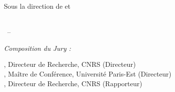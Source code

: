 \begin{titlepage}
\begin{addmargin}[-1cm]{-3cm}
\begin{center}
Sous la direction de \myProf et \myOtherProf \\ \medskip
\myDepartment \\  \medskip

\bigskip

\myTime\ -- \myVersion %

\bigskip

\textit{Composition du Jury :}

\medskip

, Directeur de Recherche, CNRS (Directeur)\\
, Maître de Conférence, Université Paris-Est (Directeur)\\
, Directeur de Recherche, CNRS (Rapporteur)\\

\vfill

\end{center}
\end{addmargin}

\end{titlepage}